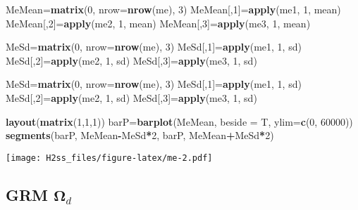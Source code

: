 \documentclass[]{article}
\newenvironment{Shaded}{\begin{snugshade}}{\end{snugshade}}
\newcommand{\DataTypeTok}[1]{\textcolor[rgb]{0.13,0.29,0.53}{#1}}
\newcommand{\DecValTok}[1]{\textcolor[rgb]{0.00,0.00,0.81}{#1}}
\newcommand{\KeywordTok}[1]{\textcolor[rgb]{0.13,0.29,0.53}{\textbf{#1}}}
\newcommand{\NormalTok}[1]{#1}
\newcommand{\OperatorTok}[1]{\textcolor[rgb]{0.81,0.36,0.00}{\textbf{#1}}}
\begin{document}
\begin{Shaded}
\begin{Highlighting}[]
\NormalTok{MeMean=}\KeywordTok{matrix}\NormalTok{(}\DecValTok{0}\NormalTok{, }\DataTypeTok{nrow=}\KeywordTok{nrow}\NormalTok{(me), }\DecValTok{3}\NormalTok{)}
\NormalTok{MeMean[,}\DecValTok{1}\NormalTok{]=}\KeywordTok{apply}\NormalTok{(me1, }\DecValTok{1}\NormalTok{, mean)}
\NormalTok{MeMean[,}\DecValTok{2}\NormalTok{]=}\KeywordTok{apply}\NormalTok{(me2, }\DecValTok{1}\NormalTok{, mean)}
\NormalTok{MeMean[,}\DecValTok{3}\NormalTok{]=}\KeywordTok{apply}\NormalTok{(me3, }\DecValTok{1}\NormalTok{, mean)}

\NormalTok{MeSd=}\KeywordTok{matrix}\NormalTok{(}\DecValTok{0}\NormalTok{, }\DataTypeTok{nrow=}\KeywordTok{nrow}\NormalTok{(me), }\DecValTok{3}\NormalTok{)}
\NormalTok{MeSd[,}\DecValTok{1}\NormalTok{]=}\KeywordTok{apply}\NormalTok{(me1, }\DecValTok{1}\NormalTok{, sd)}
\NormalTok{MeSd[,}\DecValTok{2}\NormalTok{]=}\KeywordTok{apply}\NormalTok{(me2, }\DecValTok{1}\NormalTok{, sd)}
\NormalTok{MeSd[,}\DecValTok{3}\NormalTok{]=}\KeywordTok{apply}\NormalTok{(me3, }\DecValTok{1}\NormalTok{, sd)}

\NormalTok{MeSd=}\KeywordTok{matrix}\NormalTok{(}\DecValTok{0}\NormalTok{, }\DataTypeTok{nrow=}\KeywordTok{nrow}\NormalTok{(me), }\DecValTok{3}\NormalTok{)}
\NormalTok{MeSd[,}\DecValTok{1}\NormalTok{]=}\KeywordTok{apply}\NormalTok{(me1, }\DecValTok{1}\NormalTok{, sd)}
\NormalTok{MeSd[,}\DecValTok{2}\NormalTok{]=}\KeywordTok{apply}\NormalTok{(me2, }\DecValTok{1}\NormalTok{, sd)}
\NormalTok{MeSd[,}\DecValTok{3}\NormalTok{]=}\KeywordTok{apply}\NormalTok{(me3, }\DecValTok{1}\NormalTok{, sd)}

\KeywordTok{layout}\NormalTok{(}\KeywordTok{matrix}\NormalTok{(}\DecValTok{1}\NormalTok{,}\DecValTok{1}\NormalTok{,}\DecValTok{1}\NormalTok{))}
\NormalTok{barP=}\KeywordTok{barplot}\NormalTok{(MeMean, }\DataTypeTok{beside =}\NormalTok{ T, }\DataTypeTok{ylim=}\KeywordTok{c}\NormalTok{(}\DecValTok{0}\NormalTok{, }\DecValTok{60000}\NormalTok{))}
\KeywordTok{segments}\NormalTok{(barP, MeMean}\OperatorTok{-}\NormalTok{MeSd}\OperatorTok{*}\DecValTok{2}\NormalTok{, barP, MeMean}\OperatorTok{+}\NormalTok{MeSd}\OperatorTok{*}\DecValTok{2}\NormalTok{)}
\end{Highlighting}
\end{Shaded}

\texttt{[image: H2ss\_files/figure-latex/me-2.pdf]}

\hypertarget{grm-mathbfomega_d}{%
\subsection{\texorpdfstring{GRM
\(\mathbf{\Omega}_d\)}{GRM \textbackslash{}mathbf\{\textbackslash{}Omega\}\_d}}\label{grm-mathbfomega_d}}
\end{document}
